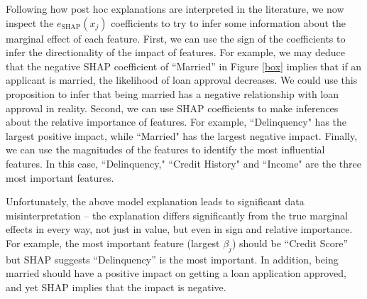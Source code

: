 \documentclass[12pt]{article}  %
\newcommand{\mM}{\mathcal{M}}
\begin{document}
 Following how post hoc explanations are interpreted in the literature, we now inspect the $e_\text{SHAP}(x_j)$ coefficients to try to infer some information about the marginal effect of each feature. First, we can use the sign of the coefficients to infer the directionality of the impact of features. For example, we may deduce that the negative SHAP coefficient of ``Married'' in Figure \ref{box} implies that if an applicant is married, the likelihood of loan approval decreases. We could use this proposition to infer that being married has a negative relationship with loan approval in reality. Second, we can use SHAP coefficients to make inferences about the relative importance of features. For example, ``Delinquency" has the largest positive impact, while ``Married" has the largest negative impact. Finally, we can use the magnitudes of the features to identify the most influential features. In this case, ``Delinquency," ``Credit History" and ``Income" are the three most important features. 


Unfortunately, the above model explanation leads to significant data misinterpretation -- the  explanation differs significantly from the true marginal effects in every way, not just in value, but even in sign and relative importance. For example, the most important feature (largest $\beta_j$) should be ``Credit Score'' but SHAP suggests ``Delinquency'' is the most important. In addition, being married should have a positive impact on getting a loan application approved, and yet SHAP implies that the impact is negative. %
\end{document}
